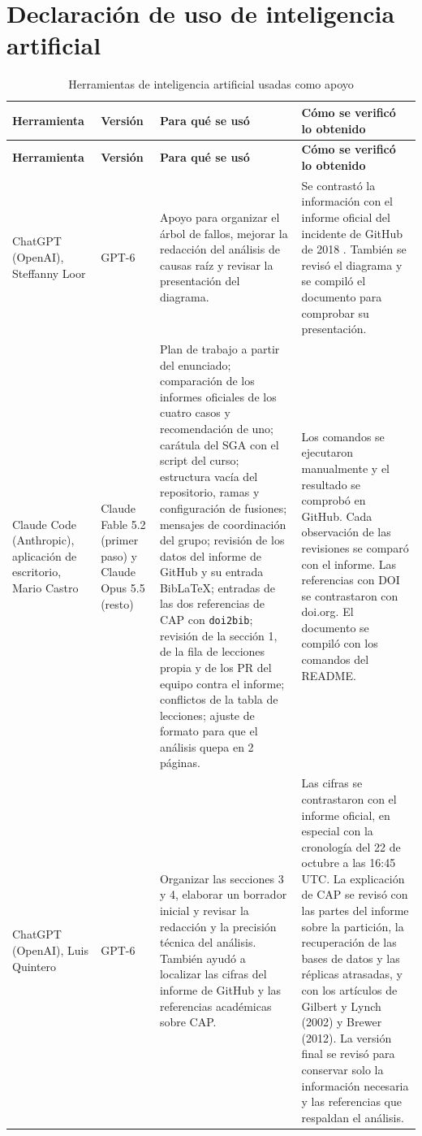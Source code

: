 \section{Declaración de uso de inteligencia artificial}
\label{sec:declaracion-ia}

{\small
\begin{xltabular}{\textwidth}{@{}>{\raggedright\arraybackslash}p{2.5cm}>{\raggedright\arraybackslash}p{1.7cm}LL@{}}
  \caption{Herramientas de inteligencia artificial usadas como apoyo}
  \label{tab:declaracion-ia} \\
  \toprule
  \textbf{Herramienta} & \textbf{Versión} & \textbf{Para qué se usó} & \textbf{Cómo se verificó lo obtenido} \\
  \midrule
  \endfirsthead
  \toprule
  \textbf{Herramienta} & \textbf{Versión} & \textbf{Para qué se usó} & \textbf{Cómo se verificó lo obtenido} \\
  \midrule
  \endhead
  \bottomrule
  \endlastfoot
    ChatGPT (OpenAI), Steffanny Loor & GPT-6 & Apoyo para organizar el árbol de fallos, mejorar la redacción del análisis de causas raíz y revisar
    la presentación del diagrama. & Se contrastó la información con el informe oficial del incidente de GitHub de 2018 \cite{Warner2018}. También se revisó el diagrama y se compiló el documento para comprobar su presentación. \\
    \addlinespace
    Claude Code (Anthropic), aplicación de escritorio, Mario Castro & Claude Fable 5.2 (primer paso) y Claude Opus 5.5 (resto) & Plan de trabajo a partir del enunciado; comparación de los informes oficiales de los cuatro casos y recomendación de uno; carátula del SGA con el script del curso; estructura vacía del repositorio, ramas y configuración de fusiones; mensajes de coordinación del grupo; revisión de los datos del informe de GitHub y su entrada BibLaTeX; entradas de las dos referencias de CAP con \texttt{doi2bib}; revisión de la sección 1, de la fila de lecciones propia y de los PR del equipo contra el informe; conflictos de la tabla de lecciones; ajuste de formato para que el análisis quepa en 2 páginas. & Los comandos se ejecutaron manualmente y el resultado se comprobó en GitHub. Cada observación de las revisiones se comparó con el informe. Las referencias con DOI se contrastaron con doi.org. El documento se compiló con los comandos del README. \\
    \addlinespace
    ChatGPT (OpenAI), Luis Quintero & GPT-6 & Organizar las secciones 3 y 4, elaborar un borrador inicial y revisar la redacción y la precisión técnica del análisis. También ayudó a localizar las cifras del informe de GitHub y las referencias académicas sobre CAP. & Las cifras se contrastaron con el informe oficial, en especial con la cronología del 22 de octubre a las 16:45 UTC. La explicación de CAP se revisó con las partes del informe sobre la partición, la recuperación de las bases de datos y las réplicas atrasadas, y con los artículos de Gilbert y Lynch (2002) y Brewer (2012). La versión final se revisó para conservar solo la información necesaria y las referencias que respaldan el análisis. \\

\end{xltabular}}
